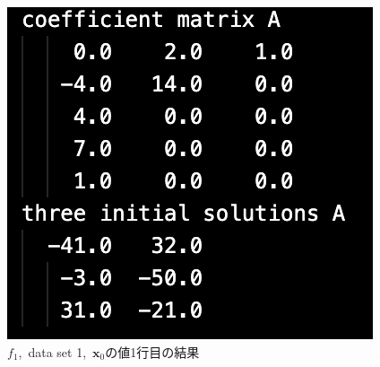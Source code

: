 \documentclass[12pt]{jarticle}
\begin{document}
\begin{figure}[h]
\begin{minipage}{0.3\hsize}
\begin{center}
        \end{center}
    \end{minipage}
    \begin{minipage}{0.3\hsize}
        \begin{center}
            \includegraphics[scale=0.4]{kadai1_2data3.png}
        \end{center}
    \end{minipage}
    \caption{$f_1$,\ data set 1,\ $\boldsymbol{x}_0$の値1行目の結果}
\end{figure}
\end{document}
